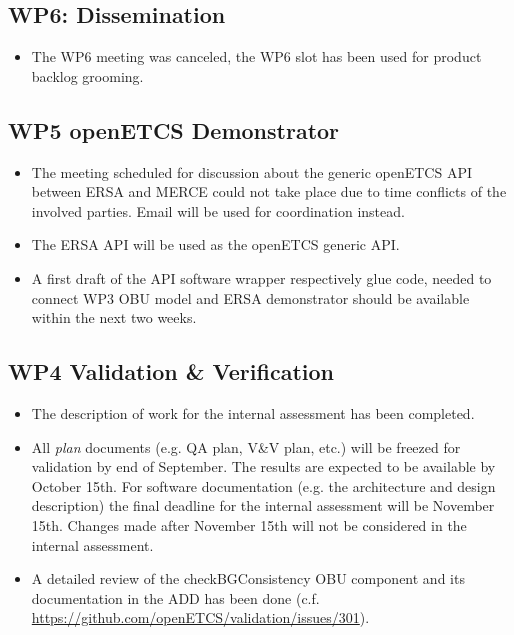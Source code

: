 \documentclass[a4paper, 11pt]{article}
\begin{document}
\subsection{WP6: Dissemination}
\begin{itemize}
\item The WP6 meeting was canceled, the WP6 slot has been used for product backlog grooming.
\end{itemize}

\subsection{WP5 openETCS Demonstrator}
\begin{itemize}
\item The meeting scheduled for discussion about the generic openETCS API between ERSA and MERCE could not take place due to time conflicts of the involved parties. Email will be used for coordination instead.
\item The ERSA API will be used as the openETCS generic API.
\item A first draft of the API software wrapper respectively glue code, needed to connect WP3 OBU model and ERSA demonstrator should be available within the next two weeks.
\end{itemize}

\subsection{WP4 Validation \& Verification}
\begin{itemize}
\item The description of work for the internal assessment has been completed.
\item All \emph{plan} documents (e.g. QA plan, V\&V plan, etc.) will be freezed for validation by end of September. The results are expected to be available by October 15th. For software documentation (e.g. the architecture and design description) the final deadline for the internal assessment will be November 15th. Changes made after November 15th will not be considered in the internal assessment.
\item A detailed review of the checkBGConsistency OBU component and its documentation in the ADD has been done (c.f. \url{https://github.com/openETCS/validation/issues/301}).
\end{itemize}
\end{document}

